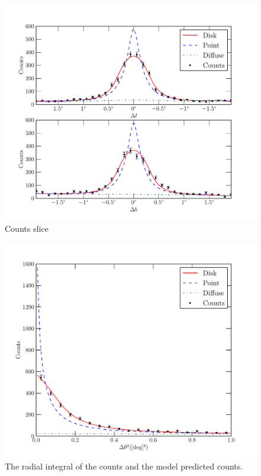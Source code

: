 \documentclass[preprint]{aastex}
\begin{document}
\clearpage
\begin{figure}
  \begin{center}
    \includegraphics{ic443_plots/ic443_counts_slice.pdf}
    \caption{Counts slice}
    \label{counts_slice}
  \end{center}
\end{figure}

\clearpage
\begin{figure}
  \begin{center}
    \includegraphics{ic443_plots/ic443_radial_integral.pdf}
    \caption{The radial integral of the counts and the model predicted counts.}
    \label{radial_profile}
  \end{center}
\end{figure}
\end{document}

